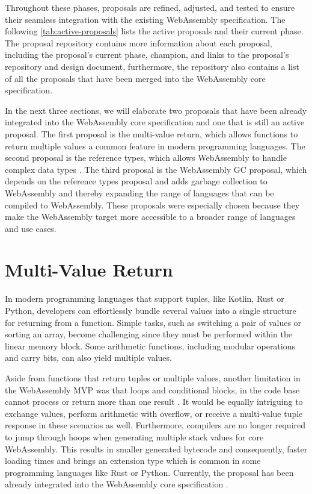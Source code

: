 Throughout these phases, proposals are refined, adjusted, and tested to ensure their seamless integration with the existing WebAssembly specification. The following \autoref{tab:active-proposals} lists the active proposals and their current phase. The proposal repository \cite{webassemblywg_2023_webassembly} contains more information about each proposal, including the proposal's current phase, champion, and links to the proposal's repository and design document, furthermore, the repository also contains a list of all the proposals that have been merged into the WebAssembly core specification.

In the next three sections, we will elaborate two proposals that have been already integrated into the WebAssembly core specification and one that is still an active proposal. The first proposal is the multi-value return, which allows functions to return multiple values a common feature in modern programming languages. The second proposal is the reference types, which allows WebAssembly to handle complex data types \cite{couriol_2020_webassembly}. The third proposal is the \gls{WebAssembly} GC proposal, which depends on the reference types proposal and adds garbage collection to WebAssembly and thereby expanding the range of languages that can be compiled to WebAssembly. These proposals were especially chosen because they make the WebAssembly target more accessible to a broader range of languages and use cases.



\section{Multi-Value Return}
\label{sec:multi-value-return}

In modern programming languages that support tuples, like Kotlin, Rust or Python, developers can effortlessly bundle several values into a single structure for returning from a function. 
Simple tasks, such as switching a pair of values or sorting an array, become challenging since they must be performed within the linear memory block. 
Some arithmetic functions, including modular operations and carry bits, can also yield multiple values.

Aside from functions that return tuples or multiple values, another limitation in the \hbox{WebAssembly} MVP was that loops and conditional blocks, in the code base cannot process or return more than one result \cite{sletten_2021_webassembly}. 
It would be equally intriguing to exchange values, perform arithmetic with overflow, or receive a multi-value tuple response in these scenarios as well. 
Furthermore, compilers are no longer required to jump through hoops when generating multiple stack values for core WebAssembly. This results in smaller generated bytecode and consequently, faster loading times and brings an extension type which is common in some programming languages like Rust or Python. Currently, the proposal has been already integrated into the WebAssembly core specification \cite{webassemblywg_2023_webassembly}. 

